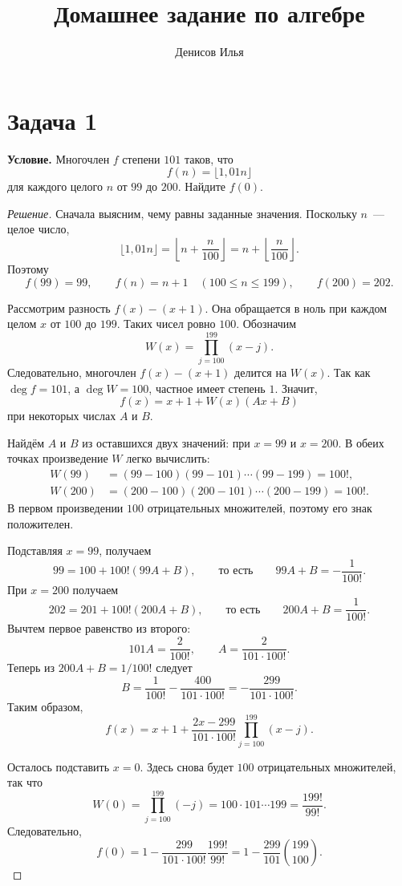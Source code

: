 \documentclass[12pt]{article}
\title{Домашнее задание по алгебре}
\author{Денисов Илья}
\date{}
\begin{document}
	\maketitle

	\section*{Задача 1}

	\noindent
	\textbf{Условие.} Многочлен $f$ степени $101$ таков, что
	\[
		f(n)=\lfloor 1{,}01n\rfloor
	\]
	для каждого целого $n$ от $99$ до $200$. Найдите $f(0)$.

	\begin{proof}[Решение]
		Сначала выясним, чему равны заданные значения. Поскольку $n$~--- целое число,
		\[
			\lfloor 1{,}01n\rfloor
			=\left\lfloor n+\frac{n}{100}\right\rfloor
			=n+\left\lfloor\frac{n}{100}\right\rfloor.
		\]
		Поэтому
		\[
			f(99)=99,\qquad
			f(n)=n+1\quad(100\leqslant n\leqslant199),\qquad
			f(200)=202.
		\]

		Рассмотрим разность $f(x)-(x+1)$. Она обращается в ноль при каждом целом
		$x$ от $100$ до $199$. Таких чисел ровно $100$. Обозначим
		\[
			W(x)=\prod_{j=100}^{199}(x-j).
		\]
		Следовательно, многочлен $f(x)-(x+1)$ делится на $W(x)$. Так как
		$\deg f=101$, а $\deg W=100$, частное имеет степень $1$. Значит,
		\[
			f(x)=x+1+W(x)(Ax+B)
		\]
		при некоторых числах $A$ и $B$.

		Найдём $A$ и $B$ из оставшихся двух значений: при $x=99$ и $x=200$.
		В обеих точках произведение $W$ легко вычислить:
		\begin{align*}
			W(99)
				&=(99-100)(99-101)\cdots(99-199)=100!,\\
			W(200)
				&=(200-100)(200-101)\cdots(200-199)=100!.
		\end{align*}
		В первом произведении $100$ отрицательных множителей, поэтому его
		знак положителен.

		Подставляя $x=99$, получаем
		\[
			99=100+100!(99A+B),
			\qquad\text{то есть}\qquad
			99A+B=-\frac{1}{100!}.
		\]
		При $x=200$ получаем
		\[
			202=201+100!(200A+B),
			\qquad\text{то есть}\qquad
			200A+B=\frac{1}{100!}.
		\]
		Вычтем первое равенство из второго:
		\[
			101A=\frac{2}{100!},
			\qquad
			A=\frac{2}{101\cdot100!}.
		\]
		Теперь из $200A+B=1/100!$ следует
		\[
			B=\frac{1}{100!}-\frac{400}{101\cdot100!}
			 =-\frac{299}{101\cdot100!}.
		\]
		Таким образом,
		\[
			f(x)=x+1+\frac{2x-299}{101\cdot100!}
				\prod_{j=100}^{199}(x-j).
		\]

		Осталось подставить $x=0$. Здесь снова будет $100$ отрицательных
		множителей, так что
		\[
			W(0)=\prod_{j=100}^{199}(-j)
				=100\cdot101\cdots199
				=\frac{199!}{99!}.
		\]
		Следовательно,
		\[
			f(0)
				=1-\frac{299}{101\cdot100!}\frac{199!}{99!}
				=1-\frac{299}{101}\binom{199}{100}.
		\]
	\end{proof}
\end{document}
